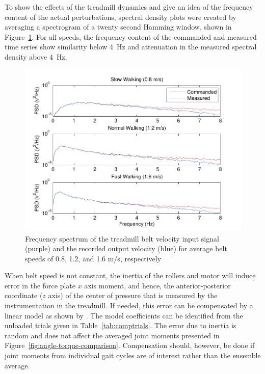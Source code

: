 \documentclass[fleqn,12pt]{wlpeerj}
\begin{document}
To show the effects of the treadmill dynamics and give an idea of the frequency
content of the actual perturbations, spectral density plots were created
by averaging a spectrogram of a twenty second Hamming window, shown
in Figure~\ref{fig:freq_analysis}. For all speeds, the frequency content of the
commanded and measured time series show similarity below 4~\si{\hertz} and
attenuation in the measured spectral density above 4~\si{\hertz}.
%
\begin{figure}
  \centering
  \includegraphics{figures/frequency_analysis.pdf}
  \caption{Frequency spectrum of the treadmill belt velocity input signal
    (purple) and the recorded output velocity (blue) for average belt speeds of
    0.8, 1.2, and 1.6 m/s, respectively}
  \label{fig:freq_analysis}
\end{figure}

When belt speed is not constant, the inertia of the rollers and motor will
induce error in the force plate $x$ axis moment, and hence, the
anterior-posterior coordinate ($z$ axis) of the center of pressure that is
measured by the instrumentation in the treadmill. If needed, this error can be
compensated by a linear model as shown by \cite{Hnat2014}. The model
coefficients can be identified from the unloaded trials given in
Table~\ref{tab:comptrials}. The error due to inertia is random and does not
affect the averaged joint moments presented in
Figure~\ref{fig:angle-torque-comparison}. Compensation should, however, be done
if joint moments from individual gait cycles are of interest rather than the
ensemble average.
%
\begin{table}
  \cprotect\caption{A list of unloaded trials collected for each speed. Each
    loaded trial includes a compensation file listed in its meta data which
    matches it to these unloaded trials. Generated by
    \verb|src/subject_table.py|.}
  \centering
  \small
  
  \label{tab:comptrials}
\end{table}
\end{document}
